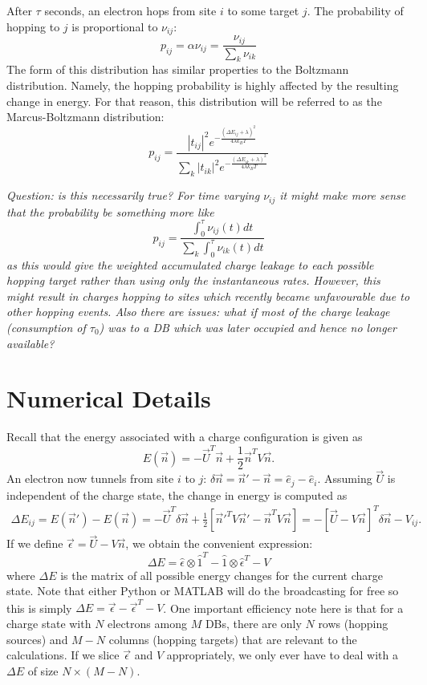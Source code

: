 \documentclass[11pt]{article}
\newcommand{\kt}{k_B T}
\newcommand{\One}{\hat{1}}
\begin{document}
After $\tau$ seconds, an electron hops from site $i$ to some target $j$. The probability of hopping to $j$ is proportional to $\nu_{ij}$:
\begin{equation}
p_{ij} = \alpha \nu_{ij} = \frac{\nu_{ij}}{\sum_k \nu_{ik}}
\end{equation}
The form of this distribution has similar properties to the Boltzmann distribution. Namely, the hopping probability is highly affected by the resulting change in energy. For that reason, this distribution will be referred to as the Marcus-Boltzmann distribution:
\[
p_{ij} = \frac{|t_{ij}|^2 e^{-\frac{(\Delta E_{ij}+\lambda)^2}{4\lambda \kt}}}{\sum_k |t_{ik}|^2 e^{-\frac{(\Delta E_{ik}+\lambda)^2}{4\lambda \kt}}}
\]

\emph{Question: is this necessarily true? For time varying $\nu_{ij}$ it might make more sense that the probability be something more like}
\[
p_{ij} = \frac{\int_0^\tau \nu_{ij}(t) dt}{\sum_k \int_0^\tau \nu_{ik}(t) dt}
\]
\emph{as this would give the weighted accumulated charge leakage to each possible hopping target rather than using only the instantaneous rates. However, this might result in charges hopping to sites which recently became unfavourable due to other hopping events. Also there are issues: what if most of the charge leakage (consumption of $\tau_0$) was to a DB which was later occupied and hence no longer available? }

\section{Numerical Details}

Recall that the energy associated with a charge configuration is given as
\[
E(\vec{n}) = -\vec{U}^T\vec{n} + \frac{1}{2}\vec{n}^T V \vec{n}.
\]
An electron now tunnels from site $i$ to $j$: $\delta \vec{n} = \vec{n}' - \vec{n} = \hat{e}_j - \hat{e}_i$. Assuming $\vec{U}$ is independent of the charge state, the change in energy is computed as
\begin{align*}
\Delta E_{ij} = E(\vec{n}') - E(\vec{n}) = -\vec{U}^T \delta \vec{n}+ \frac{1}{2} \left[\vec{n}'^T V \vec{n}' - \vec{n}^T V \vec{n} \right] = -[\vec{U} - V\vec{n}]^T\delta \vec{n} - V_{ij}.
\end{align*}
If we define $\vec{\epsilon} = \vec{U} - V\vec{n}$, we obtain the convenient expression:
\begin{equation}
\Delta E = \hat{\epsilon} \otimes \One^T - \One \otimes \hat{\epsilon}^T - V
\end{equation}
where $\Delta E$ is the matrix of all possible energy changes for the current charge state. Note that either Python or MATLAB will do the broadcasting for free so this is simply $\Delta E = \vec{\epsilon} - \vec{\epsilon}^T - V$. One important efficiency note here is that for a charge state with $N$ electrons among $M$ DBs, there are only $N$ rows (hopping sources) and $M-N$ columns (hopping targets) that are relevant to the calculations. If we slice $\vec{\epsilon}$ and $V$ appropriately, we only ever have to deal with a $\Delta E$ of size $N \times (M-N)$.
\end{document}
